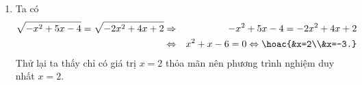 \begin{bt}
{\begin{enumerate}
\begin{eqnarray*}
				\sqrt{2 x^{2}+3 x-3}=\sqrt{-x^{2}-x+1}&\Rightarrow&2x^2+3x-3=-x^2-x+1\\
				&\Leftrightarrow& 3x^2+4x-4=0\Leftrightarrow \hoac{&x=\dfrac{2}{3}\\&x=-2.}
			\end{eqnarray*}
			Thử lại ta thấy cả hai giá trị $x=\dfrac{2}{3}$ và $x=-2$ không thỏa mãn nên phương trình đã cho vô nghiệm.
			\item Ta có \begin{eqnarray*}
				\sqrt{-x^{2}+5 x-4}=\sqrt{-2x^{2}+4x+2}&\Rightarrow&-x^{2}+5 x-4=-2 x^{2}+4 x+2\\
				&\Leftrightarrow&x^2+x-6=0\Leftrightarrow \hoac{&x=2\\&x=-3.}
			\end{eqnarray*}
			Thử lại ta thấy chỉ có giá trị $x=2$ thỏa mãn nên phương trình nghiệm duy nhất $x=2$.
		\end{enumerate}
	}
\end{bt}

